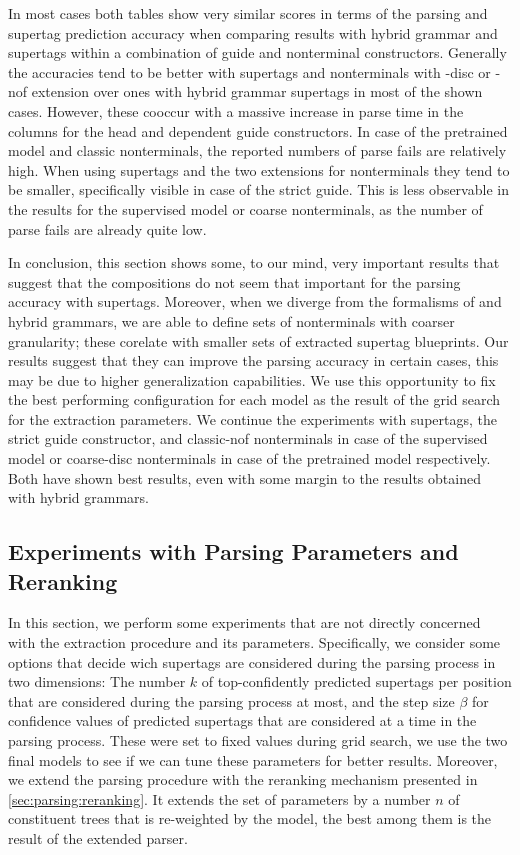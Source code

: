 \documentclass[../../document.tex]{subfiles}
\begin{document}
    In most cases both tables show very similar scores in terms of the parsing and supertag prediction accuracy when comparing results with hybrid grammar and  supertags within a combination of guide and nonterminal constructors.
    Generally the accuracies tend to be better with  supertags and nonterminals with -disc or -nof extension over ones with hybrid grammar supertags in most of the shown cases.
    However, these cooccur with a massive increase in parse time in the columns for the head and dependent guide constructors.
    In case of the pretrained model and classic nonterminals, the reported numbers of parse fails are relatively high.
    When using  supertags and the two extensions for nonterminals they tend to be smaller, specifically visible in case of the strict guide.
    This is less observable in the results for the supervised model or coarse nonterminals, as the number of parse fails are already quite low.

    In conclusion, this section shows some, to our mind, very important results that suggest that the  compositions do not seem that important for the parsing accuracy with supertags.
    Moreover, when we diverge from the formalisms of  and hybrid grammars, we are able to define sets of nonterminals with coarser granularity; these corelate with smaller sets of extracted supertag blueprints.
    Our results suggest that they can improve the parsing accuracy in certain cases, this may be due to higher generalization capabilities.
    We use this opportunity to fix the best performing configuration for each model as the result of the grid search for the extraction parameters.
    We continue the experiments with  supertags, the strict guide constructor, and classic-nof nonterminals in case of the supervised model or coarse-disc nonterminals in case of the pretrained model respectively.
    Both have shown best results, even with some margin to the results obtained with hybrid grammars.

    \subsection{Experiments with Parsing Parameters and Reranking}
    In this section, we perform some experiments that are not directly concerned with the extraction procedure and its parameters.
    Specifically, we consider some options that decide wich supertags are considered during the parsing process in two dimensions:
        The number \(k\) of top-confidently predicted supertags per position that are considered during the parsing process at most, and the step size \(\beta\) for confidence values of predicted supertags that are considered at a time in the parsing process.
    These were set to fixed values during grid search, we use the two final models to see if we can tune these parameters for better results.
    Moreover, we extend the parsing procedure with the reranking mechanism presented in \cref{sec:parsing:reranking}.
    It extends the set of parameters by a number \(n\) of constituent trees that is re-weighted by the  model, the best among them is the result of the extended parser.
\end{document}
